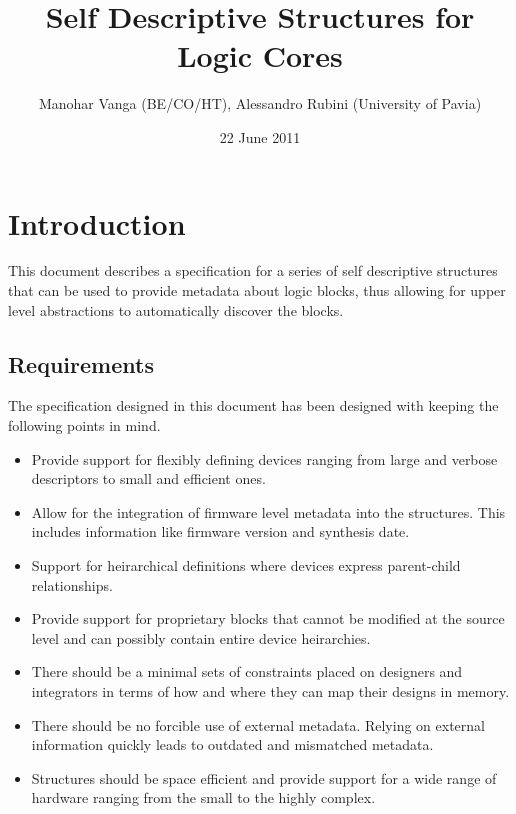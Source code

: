 \documentclass[a4paper, 12pt]{article}
\title{Self Descriptive Structures for Logic Cores}
\author{Manohar Vanga (BE/CO/HT), Alessandro Rubini (University of Pavia)}
\date{22 June 2011}
\begin{document}
\maketitle

\tableofcontents
\listoftables
\listoffigures

\pagebreak

\section{Introduction}

This document describes a specification for a series of self descriptive
structures that can be used to provide metadata about logic blocks, thus
allowing for upper level abstractions to automatically discover the blocks.

\subsection{Requirements}

The specification designed in this document has been designed with keeping
the following points in mind.

\begin{itemize}
\item Provide support for flexibly defining devices ranging from large and
verbose descriptors to small and efficient ones.
\item Allow for the integration of firmware level metadata into the structures.
This includes information like firmware version and synthesis date.
\item Support for heirarchical definitions where devices express parent-child
relationships.
\item Provide support for proprietary blocks that cannot be modified at the
source level and can possibly contain entire device heirarchies.
\item There should be a minimal sets of constraints placed on designers and
integrators in terms of how and where they can map their designs in memory.
\item There should be no forcible use of external metadata. Relying on external
information quickly leads to outdated and mismatched metadata.
\item Structures should be space efficient and provide support for a wide range
of hardware ranging from the small to the highly complex.
\end{itemize}
\end{document}
